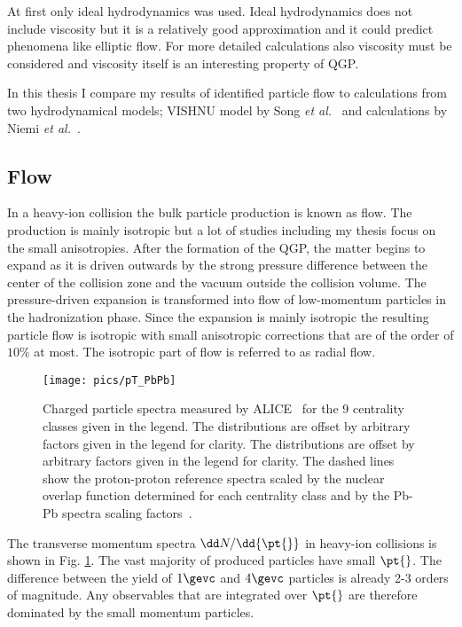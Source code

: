 At first only ideal hydrodynamics was used. Ideal hydrodynamics does not include viscosity but it is a relatively good approximation and it could predict phenomena like elliptic flow. For more detailed calculations also viscosity must be considered and viscosity itself is an interesting property of QGP.

In this thesis I compare my results of identified particle flow to calculations from two hydrodynamical models; VISHNU model by Song \emph{et al.}~\cite{Song:2013qma} and calculations by Niemi \emph{et al.}~\cite{Niemi:2012ry}.


\FloatBarrier
\pagebreak
\subsection{Flow}
In a heavy-ion collision the bulk particle production is known as flow. The production is mainly isotropic but a lot of studies including my thesis focus on the small anisotropies. After the formation of the QGP, the matter begins to expand as it is driven outwards by the strong pressure difference between the center of the collision zone and the vacuum outside the collision volume. The pressure-driven expansion is transformed into flow of low-momentum particles in the hadronization phase. Since the expansion is mainly isotropic the resulting particle flow is isotropic with small anisotropic corrections that are of the order of $10\%$ at most. The isotropic part of flow is referred to as radial flow. 

\begin{figure}[b!]
\centering
\texttt{[image: pics/pT\_PbPb]}
\caption[Charged particle spectra]{ Charged particle spectra measured by ALICE~\cite{PRL106032301} for the 9 centrality classes given in the legend. The distributions are offset by arbitrary factors given in the legend for clarity. The distributions are offset by arbitrary factors given in the legend for clarity. The dashed lines show the proton-proton reference spectra scaled by the nuclear overlap function determined for each centrality class and by the Pb-Pb spectra scaling factors~\cite{PRL106032301}.}
\label{fig:dndpt}
\end{figure}

The transverse momentum spectra $\dd N/\dd {\pt{}}$ in heavy-ion collisions is shown in Fig. \ref{fig:dndpt}. The vast majority of produced particles have small $\pt{}$. The difference between the yield of $1\gevc$ and $4\gevc$ particles is already 2-3 orders of magnitude. Any observables that are integrated over $\pt{}$ are therefore dominated by the small momentum particles.




